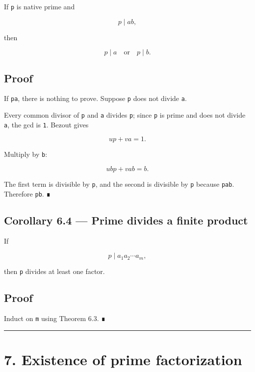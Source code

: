 If \texttt{p} is native prime and

\[
p\mid ab,
\]

then

\[
\boxed{p\mid a\quad\text{or}\quad p\mid b.}
\]

\hypertarget{proof-6}{%
\subsection{Proof}\label{proof-6}}

If \texttt{p\textbar{}a}, there is nothing to prove. Suppose \texttt{p} does not divide \texttt{a}.

Every common divisor of \texttt{p} and \texttt{a} divides \texttt{p}; since \texttt{p} is prime and does not
divide \texttt{a}, the gcd is \texttt{1}. Bezout gives

\[
up+va=1.
\]

Multiply by \texttt{b}:

\[
ubp+vab=b.
\]

The first term is divisible by \texttt{p}, and the second is divisible by \texttt{p} because
\texttt{p\textbar{}ab}. Therefore \texttt{p\textbar{}b}. ∎

\hypertarget{corollary-6.4-prime-divides-a-finite-product}{%
\subsection{Corollary 6.4 --- Prime divides a finite product}\label{corollary-6.4-prime-divides-a-finite-product}}

If

\[
p\mid a_1a_2\cdots a_m,
\]

then \texttt{p} divides at least one factor.

\hypertarget{proof-7}{%
\subsection{Proof}\label{proof-7}}

Induct on \texttt{m} using Theorem 6.3. ∎

\begin{center}\rule{0.5\linewidth}{0.5pt}\end{center}

\hypertarget{existence-of-prime-factorization}{%
\section{7. Existence of prime factorization}\label{existence-of-prime-factorization}}

